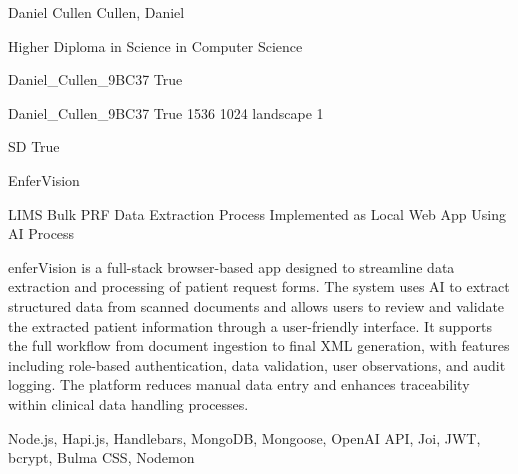 \documentclass[twoside]{report}
\begin{document}
\begingroup{}\relax



\def\Key{Daniel_Cullen_9BC37}

{Daniel Cullen}
{Cullen, Daniel}

{Higher Diploma in Science in Computer Science}

{Daniel_Cullen_9BC37}
{True}

{Daniel_Cullen_9BC37}
{True}
{1536}
{1024}
{landscape}
{1}

{SD}
{True}

{EnferVision}

{LIMS Bulk PRF Data Extraction Process Implemented as Local Web App Using AI Process}

{enferVision is a full-stack browser-based app designed to streamline data extraction and processing of patient request forms. The system uses AI to extract structured data from scanned documents and allows users to review and validate the extracted patient information through a user-friendly interface. It supports the full workflow from document ingestion to final XML generation, with features including role-based authentication, data validation, user observations, and audit logging. The platform reduces manual data entry and enhances traceability within clinical data handling processes.}

{Node.js, Hapi.js, Handlebars, MongoDB, Mongoose, OpenAI API, Joi, JWT, bcrypt, Bulma CSS, Nodemon}
\end{document}
